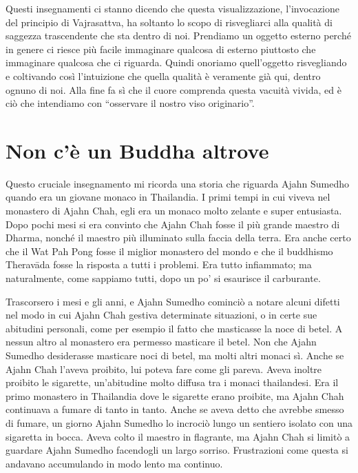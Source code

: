 Questi insegnamenti ci stanno dicendo che questa visualizzazione, l'invocazione del principio di Vajrasattva, ha soltanto lo scopo di risvegliarci alla qualità di saggezza trascendente che sta dentro di noi. Prendiamo un oggetto esterno perché in genere ci riesce più facile immaginare qualcosa di esterno piuttosto che immaginare qualcosa che ci riguarda. Quindi onoriamo quell'oggetto risvegliando e coltivando così l'intuizione che quella qualità è veramente già qui, dentro ognuno di noi. Alla fine fa sì che il cuore comprenda questa vacuità vivida, ed è ciò che intendiamo con ``osservare il nostro viso originario''.

\section*{Non c'\`e un Buddha altrove}

Questo cruciale insegnamento mi ricorda una storia che riguarda Ajahn Sumedho quando era un giovane monaco in Thailandia. I primi tempi in cui viveva nel monastero di Ajahn Chah, egli era un monaco molto zelante e super entusiasta. Dopo pochi mesi si era convinto che Ajahn Chah fosse il più grande maestro di Dharma, nonché il maestro più illuminato sulla faccia della terra. Era anche certo che il Wat Pah Pong fosse il miglior monastero del mondo e che il buddhismo Theravāda fosse la risposta a tutti i problemi. Era tutto infiammato; ma naturalmente, come sappiamo tutti, dopo un po' si esaurisce il carburante.

Trascorsero i mesi e gli anni, e Ajahn Sumedho cominciò a notare alcuni difetti nel modo in cui Ajahn Chah gestiva determinate situazioni, o in certe sue abitudini personali, come per esempio il fatto che masticasse la noce di betel. A nessun altro al monastero era permesso masticare il betel. Non che Ajahn Sumedho desiderasse masticare noci di betel, ma molti altri monaci sì. Anche se Ajahn Chah l'aveva proibito, lui poteva fare come gli pareva. Aveva inoltre proibito le sigarette, un'abitudine molto diffusa tra i monaci thailandesi. Era il primo monastero in Thailandia dove le sigarette erano proibite, ma Ajahn Chah continuava a fumare di tanto in tanto. Anche se aveva detto che avrebbe smesso di fumare, un giorno Ajahn Sumedho lo incrociò lungo un sentiero isolato con una sigaretta in bocca. Aveva colto il maestro in flagrante, ma Ajahn Chah si limitò a guardare Ajahn Sumedho facendogli un largo sorriso. Frustrazioni come questa si andavano accumulando in modo lento ma continuo.

